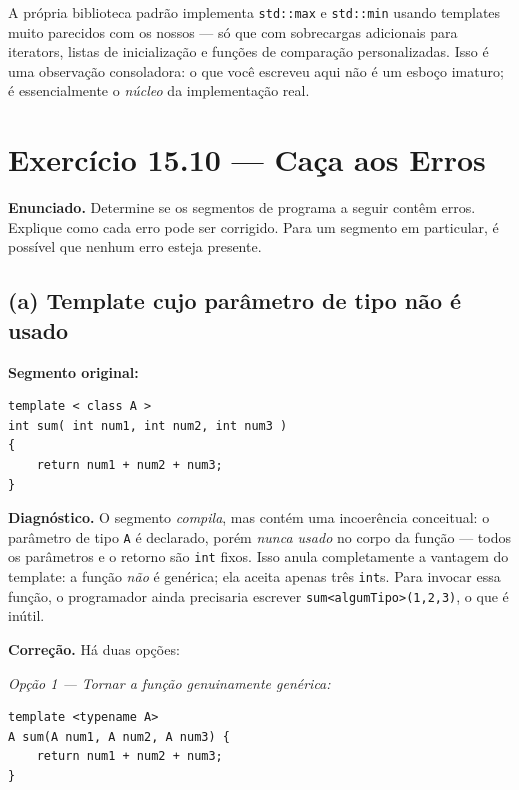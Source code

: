 \documentclass[11pt,a4paper]{article}
\begin{document}
\begin{obseng}
A pr\'opria biblioteca padr\~ao implementa \texttt{std::max} e \texttt{std::min} usando templates muito parecidos com os nossos --- s\'o que com sobrecargas adicionais para iterators, listas de inicializa\c{c}\~ao e fun\c{c}\~oes de compara\c{c}\~ao personalizadas. Isso \'e uma observa\c{c}\~ao consoladora: o que voc\^e escreveu aqui n\~ao \'e um esbo\c{c}o imaturo; \'e essencialmente o \emph{n\'ucleo} da implementa\c{c}\~ao real.
\end{obseng}

\newpage
\section{Exerc\'icio 15.10 --- Caça aos Erros}

\begin{enunciado}
\textbf{Enunciado.} Determine se os segmentos de programa a seguir cont\^em erros. Explique como cada erro pode ser corrigido. Para um segmento em particular, \'e poss\'ivel que nenhum erro esteja presente.
\end{enunciado}

\subsection*{(a) Template cujo par\^ametro de tipo n\~ao \'e usado}

\textbf{Segmento original:}
\begin{lstlisting}[style=cppcode,numbers=none]
template < class A >
int sum( int num1, int num2, int num3 )
{
    return num1 + num2 + num3;
}
\end{lstlisting}

\textbf{Diagn\'ostico.} O segmento \emph{compila}, mas cont\'em uma incoer\^encia conceitual: o par\^ametro de tipo \texttt{A} \'e declarado, por\'em \emph{nunca usado} no corpo da fun\c{c}\~ao --- todos os par\^ametros e o retorno s\~ao \texttt{int} fixos. Isso anula completamente a vantagem do template: a fun\c{c}\~ao \emph{n\~ao} \'e gen\'erica; ela aceita apenas tr\^es \texttt{int}s. Para invocar essa fun\c{c}\~ao, o programador ainda precisaria escrever \texttt{sum<algumTipo>(1,2,3)}, o que \'e in\'util.

\textbf{Corre\c{c}\~ao.} H\'a duas op\c{c}\~oes:

\textit{Op\c{c}\~ao 1 --- Tornar a fun\c{c}\~ao genuinamente gen\'erica:}
\begin{lstlisting}[style=cppcode,numbers=none]
template <typename A>
A sum(A num1, A num2, A num3) {
    return num1 + num2 + num3;
}
\end{lstlisting}
\end{document}
